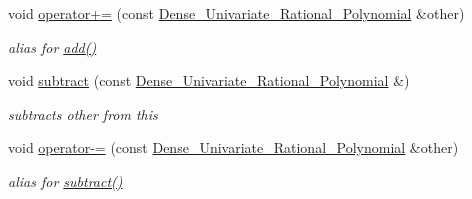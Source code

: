 \begin{Indent}
\begin{DoxyCompactItemize}
\mbox{\label{class_dense___univariate___rational___polynomial_a61d2068402442a595dde1fcc4dc40f52}} 
void \hyperlink{class_dense___univariate___rational___polynomial_a61d2068402442a595dde1fcc4dc40f52}{operator+=} (const \hyperlink{class_dense___univariate___rational___polynomial}{Dense\+\_\+\+Univariate\+\_\+\+Rational\+\_\+\+Polynomial} \&other)
\begin{DoxyCompactList}\small\item\em alias for \hyperlink{class_dense___univariate___rational___polynomial_a8cf0a014475645d777b7f3168d632a93}{add()} \end{DoxyCompactList}\item 
\mbox{\label{class_dense___univariate___rational___polynomial_aab4902fd7521146ea739f9f3f8c0c8b6}} 
void \hyperlink{class_dense___univariate___rational___polynomial_aab4902fd7521146ea739f9f3f8c0c8b6}{subtract} (const \hyperlink{class_dense___univariate___rational___polynomial}{Dense\+\_\+\+Univariate\+\_\+\+Rational\+\_\+\+Polynomial} \&)
\begin{DoxyCompactList}\small\item\em subtracts {\ttfamily other} from {\ttfamily this} \end{DoxyCompactList}\item 
\mbox{\label{class_dense___univariate___rational___polynomial_a7bb6d8ed216e5575773013a19052e79c}} 
void \hyperlink{class_dense___univariate___rational___polynomial_a7bb6d8ed216e5575773013a19052e79c}{operator-\/=} (const \hyperlink{class_dense___univariate___rational___polynomial}{Dense\+\_\+\+Univariate\+\_\+\+Rational\+\_\+\+Polynomial} \&other)
\begin{DoxyCompactList}\small\item\em alias for \hyperlink{class_dense___univariate___rational___polynomial_aab4902fd7521146ea739f9f3f8c0c8b6}{subtract()} \end{DoxyCompactList}\end{DoxyCompactItemize}
\end{Indent}
